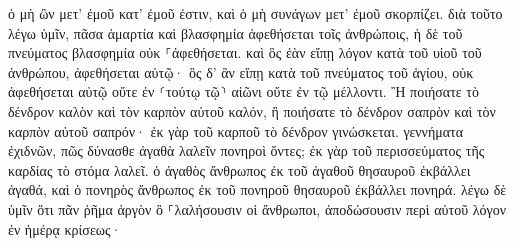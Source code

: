 \documentclass{openreader}
\begin{document}
ὁ μὴ ὢν μετ’ ἐμοῦ κατ’ ἐμοῦ ἐστιν, καὶ ὁ μὴ συνάγων μετ’ ἐμοῦ σκορπίζει. 
διὰ τοῦτο λέγω ὑμῖν, πᾶσα ἁμαρτία καὶ βλασφημία ἀφεθήσεται τοῖς ἀνθρώποις, ἡ δὲ τοῦ πνεύματος βλασφημία οὐκ ⸀ἀφεθήσεται. 
καὶ ὃς ἐὰν εἴπῃ λόγον κατὰ τοῦ υἱοῦ τοῦ ἀνθρώπου, ἀφεθήσεται αὐτῷ· ὃς δ’ ἂν εἴπῃ κατὰ τοῦ πνεύματος τοῦ ἁγίου, οὐκ ἀφεθήσεται αὐτῷ οὔτε ἐν ⸂τούτῳ τῷ⸃ αἰῶνι οὔτε ἐν τῷ μέλλοντι. 
Ἢ ποιήσατε τὸ δένδρον καλὸν καὶ τὸν καρπὸν αὐτοῦ καλόν, ἢ ποιήσατε τὸ δένδρον σαπρὸν καὶ τὸν καρπὸν αὐτοῦ σαπρόν· ἐκ γὰρ τοῦ καρποῦ τὸ δένδρον γινώσκεται. 
γεννήματα ἐχιδνῶν, πῶς δύνασθε ἀγαθὰ λαλεῖν πονηροὶ ὄντες; ἐκ γὰρ τοῦ περισσεύματος τῆς καρδίας τὸ στόμα λαλεῖ. 
ὁ ἀγαθὸς ἄνθρωπος ἐκ τοῦ ἀγαθοῦ θησαυροῦ ἐκβάλλει ἀγαθά, καὶ ὁ πονηρὸς ἄνθρωπος ἐκ τοῦ πονηροῦ θησαυροῦ ἐκβάλλει πονηρά. 
λέγω δὲ ὑμῖν ὅτι πᾶν ῥῆμα ἀργὸν ὃ ⸀λαλήσουσιν οἱ ἄνθρωποι, ἀποδώσουσιν περὶ αὐτοῦ λόγον ἐν ἡμέρᾳ κρίσεως· 
\end{document}
